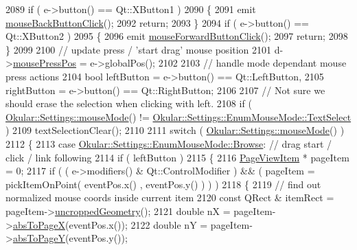 \begin{DoxyCode}
2089     \textcolor{keywordflow}{if} ( e->button() == Qt::XButton1 )
2090     \{
2091         emit \hyperlink{classPageView_a8b0a87f4acb179634452cbe114572a47}{mouseBackButtonClick}();
2092         \textcolor{keywordflow}{return};
2093     \}
2094     \textcolor{keywordflow}{if} ( e->button() == Qt::XButton2 )
2095     \{
2096         emit \hyperlink{classPageView_af268becfa1f02cb231f5779ea154918d}{mouseForwardButtonClick}();
2097         \textcolor{keywordflow}{return};
2098     \}
2099 
2100     \textcolor{comment}{// update press / 'start drag' mouse position}
2101     d->\hyperlink{classPageViewPrivate_aa4799ae3aa24957d19a95220d8f61216}{mousePressPos} = e->globalPos();
2102 
2103     \textcolor{comment}{// handle mode dependant mouse press actions}
2104     \textcolor{keywordtype}{bool} leftButton = e->button() == Qt::LeftButton,
2105          rightButton = e->button() == Qt::RightButton;
2106 
2107 \textcolor{comment}{//   Not sure we should erase the selection when clicking with left.}
2108      \textcolor{keywordflow}{if} ( \hyperlink{classOkular_1_1Settings_af8e39e25e841b413d67af2cb4dfc0688}{Okular::Settings::mouseMode}() != 
      \hyperlink{classOkular_1_1Settings_1_1EnumMouseMode_ab2ae04e2d7d069f02195ccf32c52415bafafb47a3dab02c4016246ee80090e2d9}{Okular::Settings::EnumMouseMode::TextSelect} )
2109        textSelectionClear();
2110 
2111     \textcolor{keywordflow}{switch} ( \hyperlink{classOkular_1_1Settings_af8e39e25e841b413d67af2cb4dfc0688}{Okular::Settings::mouseMode}() )
2112     \{
2113         \textcolor{keywordflow}{case} \hyperlink{classOkular_1_1Settings_1_1EnumMouseMode_ab2ae04e2d7d069f02195ccf32c52415bae5c77f74b0cf35d7838da1baaad4e822}{Okular::Settings::EnumMouseMode::Browse}:   \textcolor{comment}{// drag
       start / click / link following}
2114             \textcolor{keywordflow}{if} ( leftButton )
2115             \{
2116                 \hyperlink{classPageViewItem}{PageViewItem} * pageItem = 0;
2117                 \textcolor{keywordflow}{if} ( ( e->modifiers() & Qt::ControlModifier ) && ( pageItem = pickItemOnPoint( eventPos.x()
      , eventPos.y() ) ) )
2118                 \{
2119                     \textcolor{comment}{// find out normalized mouse coords inside current item}
2120                     \textcolor{keyword}{const} QRect & itemRect = pageItem->\hyperlink{classPageViewItem_a5d2e73a003f65b4e95c0c21b1698f835}{uncroppedGeometry}();
2121                     \textcolor{keywordtype}{double} nX = pageItem->\hyperlink{classPageViewItem_ac8c32541cbae1efd5b4ab54f0a4b4576}{absToPageX}(eventPos.x());
2122                     \textcolor{keywordtype}{double} nY = pageItem->\hyperlink{classPageViewItem_afdbba9ce015155c0e655efbb23e5d13b}{absToPageY}(eventPos.y());

\end{DoxyCode}
